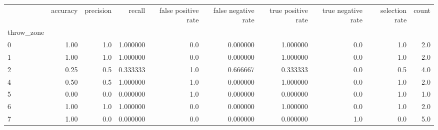 \begin{tabular}{lrrrrrrrrr}
\toprule
{} &  accuracy &  precision &    recall &  false positive rate &  false negative rate &  true positive rate &  true negative rate &  selection rate &  count \\
throw\_zone &           &            &           &                      &                      &                     &                     &                 &        \\
\midrule
0          &      1.00 &        1.0 &  1.000000 &                  0.0 &             0.000000 &            1.000000 &                 0.0 &             1.0 &    2.0 \\
1          &      1.00 &        1.0 &  1.000000 &                  0.0 &             0.000000 &            1.000000 &                 0.0 &             1.0 &    2.0 \\
2          &      0.25 &        0.5 &  0.333333 &                  1.0 &             0.666667 &            0.333333 &                 0.0 &             0.5 &    4.0 \\
4          &      0.50 &        0.5 &  1.000000 &                  1.0 &             0.000000 &            1.000000 &                 0.0 &             1.0 &    2.0 \\
5          &      0.00 &        0.0 &  0.000000 &                  1.0 &             0.000000 &            0.000000 &                 0.0 &             1.0 &    1.0 \\
6          &      1.00 &        1.0 &  1.000000 &                  0.0 &             0.000000 &            1.000000 &                 0.0 &             1.0 &    2.0 \\
7          &      1.00 &        0.0 &  0.000000 &                  0.0 &             0.000000 &            0.000000 &                 1.0 &             0.0 &    5.0 \\
\bottomrule
\end{tabular}
